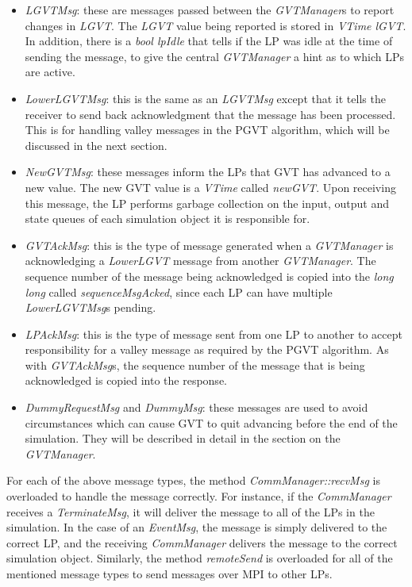 \documentclass[11pt]{report}
\begin{document}
\begin{itemize}

\item
{\it LGVTMsg}: these are messages passed between the {\it GVTManager}s
to report changes in {\it LGVT}.  The {\it LGVT} value being reported
is stored in {\it VTime lGVT}.  In addition, there is a {\it bool
lpIdle} that tells if the LP was idle at the time of sending the
message, to give the central {\it GVTManager} a hint as to which LPs
are active.

\item
{\it LowerLGVTMsg}: this is the same as an {\it LGVTMsg} except that
it tells the receiver to send back acknowledgment that the message has
been processed.  This is for handling valley messages in the PGVT
algorithm, which will be discussed in the next section.

\item
{\it NewGVTMsg}: these messages inform the LPs that GVT has advanced to
a new value.  The new GVT value is a {\it VTime} called {\it  newGVT}.
Upon receiving this message, the LP performs garbage collection on the
input, output and state queues of each simulation object it is
responsible for.

\item
{\it GVTAckMsg}: this is the type of message generated when a {\it 
GVTManager} is acknowledging a {\it LowerLGVT} message from another
{\it GVTManager}.  The sequence number of the message being
acknowledged is copied into the {\it long long} called {\it 
sequenceMsgAcked}, since each LP can have multiple {\it LowerLGVTMsg}s
pending.

\item
{\it LPAckMsg}: this is the type of message sent from one LP to another
to accept responsibility for a valley message as required by the PGVT
algorithm.  As with {\it GVTAckMsg}s, the sequence number of the
message that is being acknowledged is copied into the response.

\item
{\it DummyRequestMsg} and {\it DummyMsg}: these messages are used to
avoid circumstances which can cause GVT to quit advancing before the end
of the simulation.  They will be described in detail in the section on
the {\it GVTManager}.
\end{itemize}

For each of the above message types, the method {\it CommManager::recvMsg}
is overloaded to handle the message correctly.  For instance, if the {\it
CommManager} receives a {\it TerminateMsg}, it will deliver the message to
all of the LPs in the simulation.  In the case of an {\it EventMsg}, the
message is simply delivered to the correct LP, and the receiving {\it
CommManager} delivers the message to the correct simulation object.
Similarly, the method {\it remoteSend} is overloaded for all of the
mentioned message types to send messages over MPI to other LPs.
\end{document}
